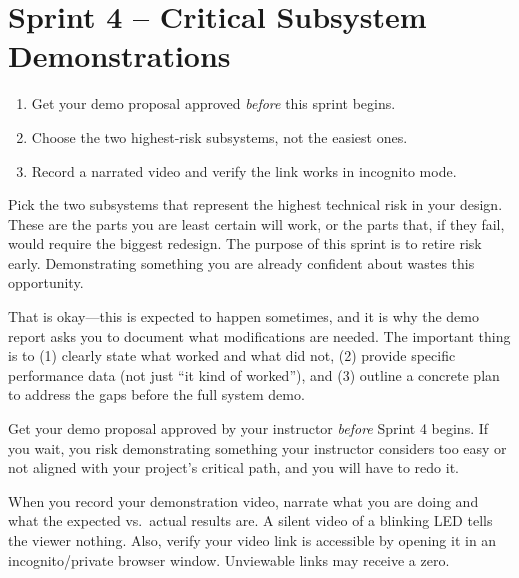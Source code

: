 \documentclass[11pt,letterpaper]{article}
\begin{document}
\section{Sprint 4 -- Critical Subsystem Demonstrations}

\begin{priorities}
\begin{enumerate}[leftmargin=*, itemsep=1pt, topsep=0pt]
    \item Get your demo proposal approved \textit{before} this sprint begins.
    \item Choose the two highest-risk subsystems, not the easiest ones.
    \item Record a narrated video and verify the link works in incognito mode.
\end{enumerate}
\end{priorities}

\begin{faqbox}
Pick the two subsystems that represent the highest technical risk in your design. These are the parts you are least certain will work, or the parts that, if they fail, would require the biggest redesign. The purpose of this sprint is to retire risk early. Demonstrating something you are already confident about wastes this opportunity.
\end{faqbox}

\begin{faqbox}
That is okay---this is expected to happen sometimes, and it is why the demo report asks you to document what modifications are needed. The important thing is to (1) clearly state what worked and what did not, (2) provide specific performance data (not just ``it kind of worked''), and (3) outline a concrete plan to address the gaps before the full system demo.
\end{faqbox}

\begin{warnbox}
Get your demo proposal approved by your instructor \textit{before} Sprint 4 begins. If you wait, you risk demonstrating something your instructor considers too easy or not aligned with your project's critical path, and you will have to redo it.
\end{warnbox}

\begin{protip}
When you record your demonstration video, narrate what you are doing and what the expected vs.\ actual results are. A silent video of a blinking LED tells the viewer nothing. Also, verify your video link is accessible by opening it in an incognito/private browser window. Unviewable links may receive a zero.
\end{protip}
\end{document}
